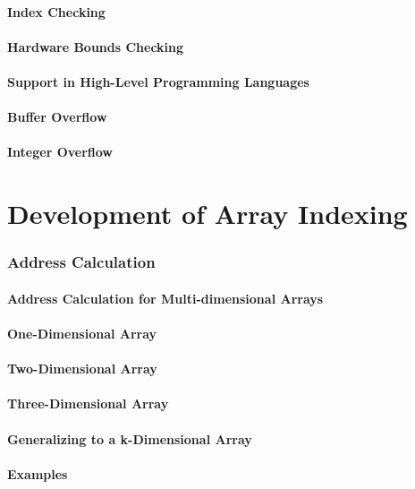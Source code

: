 \documentclass[12pt, oneside]{book}
\begin{document}
	\subsubsection{Index Checking}
	\subsubsection{Hardware Bounds Checking}
	\subsubsection{Support in High-Level Programming Languages}
	\subsubsection{Buffer Overflow}
	\subsubsection{Integer Overflow}
	\chapter{Development of Array Indexing}
	\subsection{Address Calculation}
	\subsubsection{Address Calculation for Multi-dimensional Arrays}
	\subsubsection{One-Dimensional Array}
	\subsubsection{Two-Dimensional Array}
	\subsubsection{Three-Dimensional Array}
	\subsubsection{Generalizing to a k-Dimensional Array}
	\subsubsection{Examples}
\end{document}
